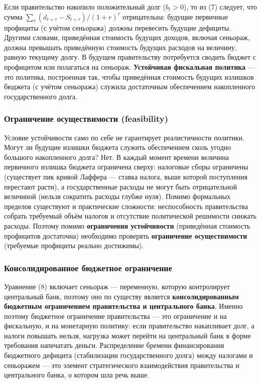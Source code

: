 \documentclass[11pt,a4paper]{article}
\begin{document}
Если правительство накопило положительный долг ($b_t>0$), то из (7) следует, что сумма $\sum_{\tau}(d_{t+\tau}-S_{t+\tau})/(1+r)^{\tau}$ отрицательна: будущие первичные профициты (с учётом сеньоража) должны перевесить будущие дефициты. Другими словами, приведённая стоимость будущих доходов, включая сеньораж, должна превышать приведённую стоимость будущих расходов на величину, равную текущему долгу. В будущем правительству потребуется сводить бюджет с профицитом или полагаться на сеньораж. \textbf{Устойчивая фискальная политика} --- это политика, построенная так, чтобы приведённая стоимость будущих излишков бюджета (с учётом сеньоража) служила достаточным обеспечением накопленного государственного долга.

\subsubsection{Ограничение осуществимости (feasibility)}

Условие устойчивости само по себе не гарантирует реалистичности политики. Могут ли будущие излишки бюджета служить обеспечением сколь угодно большого накопленного долга? Нет. В каждый момент времени величина первичного излишка бюджета ограничена сверху: налоговые сборы ограничены (существует пик кривой Лаффера --- ставка налога, выше которой поступления перестают расти), а государственные расходы не могут быть отрицательной величиной (нельзя сократить расходы глубже нуля). Помимо формальных пределов существуют и практические сложности: неспособность правительства собрать требуемый объём налогов и отсутствие политической решимости снижать расходы. Поэтому помимо \textbf{ограничения устойчивости} (приведённая стоимость профицитов достаточна) необходимо проверять \textbf{ограничение осуществимости} (требуемые профициты реально достижимы).

\subsubsection{Консолидированное бюджетное ограничение}

Уравнение (8) включает сеньораж --- переменную, которую контролирует центральный банк, поэтому оно по существу является \textbf{консолидированным бюджетным ограничением правительства и центрального банка}. Именно поэтому бюджетное ограничение правительства --- это ограничение и на фискальную, и на монетарную политику: если правительство накапливает долг, а налоги повышать нельзя, нагрузка может перейти на центральный банк в форме требования напечатать деньги. Распределение бремени финансирования бюджетного дефицита (стабилизации государственного долга) между налогами и сеньоражем --- это элемент стратегического взаимодействия правительства и центрального банка, о котором шла речь выше.
\end{document}
